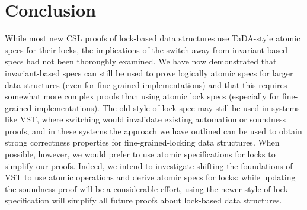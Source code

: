 \documentclass[runningheads]{llncs}
\begin{document}



\section{Conclusion}
\label{conclusion}
While most new CSL proofs of lock-based data structures use TaDA-style atomic specs for their locks, the implications of the switch away from invariant-based specs had not been thoroughly examined. We have now demonstrated that invariant-based specs can still be used to prove logically atomic specs for larger data structures (even for fine-grained implementations) and that this requires somewhat more complex proofs than using atomic lock specs (especially for fine-grained implementations). The old style of lock spec may still be used in systems like VST, where switching would invalidate existing automation or soundness proofs, and in these systems the approach we have outlined can be used to obtain strong correctness properties for fine-grained-locking data structures. When possible, however, we would prefer to use atomic specifications for locks to simplify our proofs. Indeed, we intend to investigate shifting the foundations of VST to use atomic operations and derive atomic specs for locks: while updating the soundness proof will be a considerable effort, using the newer style of lock specification will simplify all future proofs about lock-based data structures.
\end{document}
